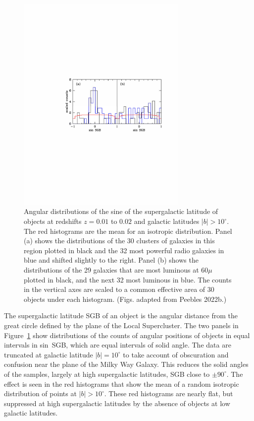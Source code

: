 \documentclass[fleqn,usenatbib]{mnras}
\begin{document}
\begin{figure}
\begin{center}
\includegraphics[angle=0,width=3.25in]{LSC.pdf} 
\caption{Angular distributions of the sine of the supergalactic latitude of objects at redshifts $z=0.01$ to $0.02$ and galactic latitudes $|b|>10^\circ$. The red histograms are the mean for an isotropic distribution. Panel (a) shows the distributions of the 30 clusters of galaxies in this region plotted in black and the 32 most powerful radio galaxies in blue and shifted slightly to the right. Panel (b) shows the distributions of the 29 galaxies that are most luminous at $60\mu$ plotted in black, and the next 32 most luminous in blue. The counts in the vertical axes are scaled to a common effective area of 30 objects under each histogram. (Figs. adapted from Peebles 2022b.)}\label{fig:LSCf}
\end{center}
\end{figure}

The supergalactic latitude SGB of an object is the angular distance from the great circle defined by the plane of the Local Supercluster. The two panels in Figure~\ref{fig:LSCf} show distributions of the counts of angular positions of objects in equal intervals in sin~SGB, which are equal intervals of solid angle. The data are truncated at galactic latitude $|b|=10^\circ$ to take account of obscuration and confusion near the plane of the Milky Way Galaxy. This reduces the solid angles of the samples, largely at high supergalactic latitudes, SGB close to $\pm 90^\circ$. The effect is seen in the red histograms that show the mean of a random isotropic distribution of points at $|b|>10^\circ$. These red histograms are nearly flat, but suppressed at high supergalactic latitudes by the absence of objects at low galactic latitudes. 
\end{document}
